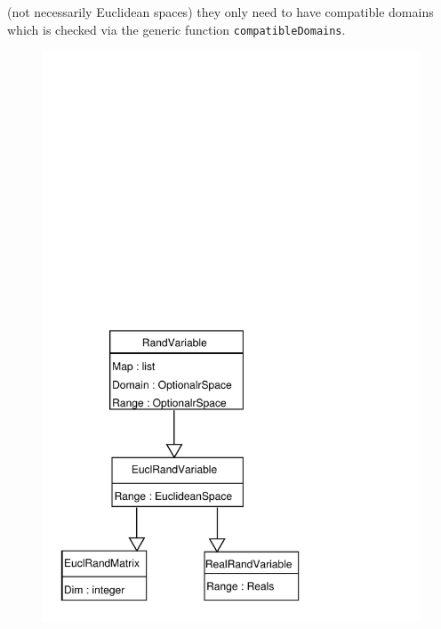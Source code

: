 \documentclass[11pt]{article}
\begin{document}
(not necessarily Euclidean spaces) they only need to have compatible
domains which is checked via the generic function {\tt compatibleDomains}.
\begin{figure}[!ht]
\begin{center}
  \ifpdf
    \includegraphics[scale=1.0, viewport = 14 15 244 275]{RandVariable.pdf}
  \else

\end{center}
\end{figure}
\end{document}
